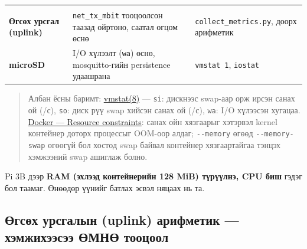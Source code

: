 \begin{longtable}[]{@{}lll@{}}
\begin{minipage}[t]{0.30\columnwidth}
\end{minipage}\tabularnewline
\begin{minipage}[t]{0.30\columnwidth}\raggedright
\textbf{Өгсөх урсгал (uplink)}\strut
\end{minipage} & \begin{minipage}[t]{0.30\columnwidth}\raggedright
\texttt{net\_\allowbreak{}tx\_\allowbreak{}mbit} тооцоолсон таазад ойртоно, саатал огцом өснө\strut
\end{minipage} & \begin{minipage}[t]{0.30\columnwidth}\raggedright
\texttt{collect\_\allowbreak{}metrics.\allowbreak{}py}, доорх арифметик\strut
\end{minipage}\tabularnewline
\begin{minipage}[t]{0.30\columnwidth}\raggedright
\textbf{microSD}\strut
\end{minipage} & \begin{minipage}[t]{0.30\columnwidth}\raggedright
I/O хүлээлт (\texttt{wa}) өснө, mosquitto-гийн persistence удаашрана\strut
\end{minipage} & \begin{minipage}[t]{0.30\columnwidth}\raggedright
\texttt{vmstat\ 1}, \texttt{iostat}\strut
\end{minipage}\tabularnewline
\bottomrule
\end{longtable}\endgroup

\begin{quote}
Албан ёсны баримт: \href{https://man7.org/linux/man-pages/man8/vmstat.8.html}{vmstat(8)} --- \texttt{si}: дискнээс swap-аар орж ирсэн санах ой (/с), \texttt{so}: диск рүү swap хийсэн санах ой (/с), \texttt{wa}: I/O хүлээсэн хугацаа. \href{https://docs.docker.com/engine/containers/resource_constraints/}{Docker --- Resource constraints}: санах ойн хязгаарыг хэтэрвэл kernel контейнер доторх процессыг OOM-оор алдаг; \texttt{-\/-memory} өгөөд \texttt{-\/-memory-swap} өгөөгүй бол хостод swap байвал контейнер хязгаартайгаа тэнцэх хэмжээний swap ашиглаж болно.
\end{quote}

Pi 3B дээр \textbf{RAM (эхлээд контейнерийн 128 MiB) түрүүлнэ, CPU биш} гэдэг бол таамаг. Өнөөдөр үүнийг батлах эсвэл няцаах нь та.

\hypertarget{ux4e9ux433ux441ux4e9ux445-ux443ux440ux441ux433ux430ux43bux44bux43d-uplink-ux430ux440ux438ux444ux43cux435ux442ux438ux43a-ux445ux44dux43cux436ux438ux445ux44dux44dux441ux44dux44d-ux4e9ux43cux43dux4e9-ux442ux43eux43eux446ux43eux43eux43b}{%
\subsection{Өгсөх урсгалын (uplink) арифметик --- хэмжихээсээ ӨМНӨ тооцоол}\label{ux4e9ux433ux441ux4e9ux445-ux443ux440ux441ux433ux430ux43bux44bux43d-uplink-ux430ux440ux438ux444ux43cux435ux442ux438ux43a-ux445ux44dux43cux436ux438ux445ux44dux44dux441ux44dux44d-ux4e9ux43cux43dux4e9-ux442ux43eux43eux446ux43eux43eux43b}}

